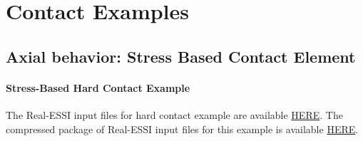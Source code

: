 







\clearpage
\newpage
\section{Contact Examples}
\label{Contact_Examples}
\subsection{ Axial behavior: Stress Based Contact Element}


\paragraph{Stress-Based Hard Contact Example}
The Real-ESSI input files for hard contact example are available 
\href{http://sokocalo.engr.ucdavis.edu/~jeremic/lecture_notes_online_material/_Chapter_Short_Course_Examples/short-course-examples/Day3/Contact_Examples/axial/HardContact_Elastic_Perfectly_Plastic_Shear_Model}{HERE}. 
The compressed package of Real-ESSI input files for this example is available 
\href{http://sokocalo.engr.ucdavis.edu/~jeremic/lecture_notes_online_material/_Chapter_Short_Course_Examples/short-course-examples/Day3/Contact_Examples/axial/HardContact_Elastic_Perfectly_Plastic_Shear_Model/_all_files_packaged_for_HardContact_Elastic_Perfectly_Plastic_Shear_Model.tar.gz}{HERE}. 


